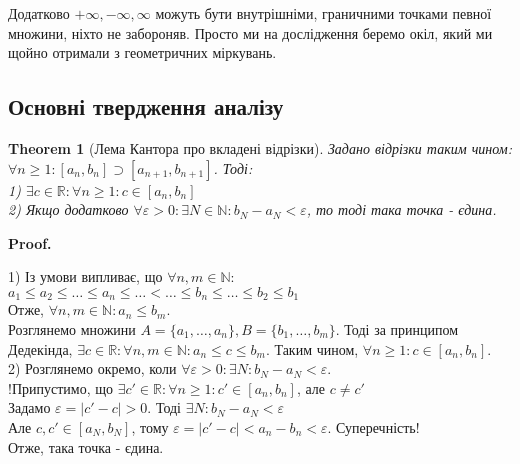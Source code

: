 \documentclass[a4paper, 14pt]{article}
\makeatletter
\def\qed{$\blacksquare$}
\theoremstyle{theoremdd}
\newtheorem{theorem}{Theorem}[subsection]
\theoremstyle{theoremdd}
\theoremstyle{theoremdd}
\theoremstyle{theoremdd}
\theoremstyle{theoremdd}
\theoremstyle{theoremdd}
\theoremstyle{theoremdd}
\theoremstyle{theoremdd}
\renewenvironment{proof}[1][Proof.\\]{\par
\pushQED{\hfill \qed}%
\normalfont \topsep6\p@\@plus6\p@\relax
\trivlist
\item\relax
{\bfseries
#1\@addpunct{.}}\hspace\labelsep\ignorespaces
}{%
\popQED\endtrivlist\@endpefalse
}
\makeatother
\begin{document}
	Додатково $+\infty, -\infty, \infty$ можуть бути внутрішніми, граничними точками певної множини, ніхто не забороняв. Просто ми на дослідження беремо окіл, який ми щойно отримали з геометричних міркувань.
	
	\subsection{Основні твердження аналізу}
	\begin{theorem}[Лема Кантора про вкладені відрізки]
	Задано відрізки таким чином: $\forall n \geq 1: [a_n, b_n] \supset [a_{n+1}, b_{n+1}]$. Тоді:\\
	1) $\exists c \in \mathbb{R}: \forall n \geq 1: c \in [a_n,b_n]$\\
	2) Якщо додатково $\forall \varepsilon > 0: \exists N \in \mathbb{N}: b_N - a_N < \varepsilon$, то тоді така точка - єдина.
	\begin{figure}[H]
	\centering
	\end{figure}
	\end{theorem}
	
	\begin{proof}
	1) Із умови випливає, що $\forall n,m \in \mathbb{N}:$\\
	$a_1 \leq a_2 \leq \dots \leq a_n \leq \dots < \dots \leq b_n \leq \dots \leq b_2 \leq b_1$\\
	Отже, $\forall n,m \in \mathbb{N}: a_n \leq b_m$.\\
	Розглянемо множини $A = \{a_1,\dots,a_n\}, B = \{b_1, \dots, b_m\}$.
	Тоді за принципом Дедекінда, $\exists c \in \mathbb{R}: \forall n,m \in \mathbb{N}: a_n \leq c \leq b_m$.
	Таким чином, $\forall n \geq 1: c \in [a_n,b_n]$.
	\bigskip \\
	2) Розглянемо окремо, коли $\forall \varepsilon > 0: \exists N: b_N - a_N < \varepsilon$.\\
	!Припустимо, що $\exists c' \in \mathbb{R}: \forall n \geq 1: c' \in [a_n,b_n]$, але $c \neq c'$\\
	Задамо $\varepsilon = |c' - c| > 0$.
	Тоді $\exists N: b_N - a_N < \varepsilon$\\
	Але $c,c' \in [a_N,b_N]$, тому $\varepsilon = |c'-c| < a_n-b_n < \varepsilon$. Суперечність!\\
	Отже, така точка - єдина.
	\end{proof}
	
\end{document}
